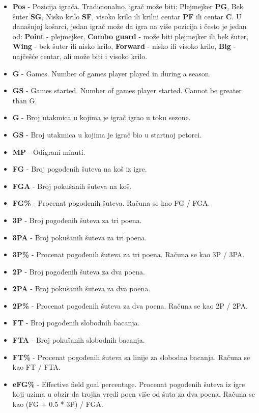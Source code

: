 \documentclass[a4paper]{article}
\begin{document}
\begin{itemize}
	\item \textbf{Pos} - Pozicija igrača. Tradicionalno, igrač može biti: Plejmejker \textbf{PG}, Bek šuter \textbf{SG}, Nisko krilo \textbf{SF}, visoko krilo ili krilni centar \textbf{PF} ili centar \textbf{C}. U današnjoj košarci, jedan igrač može da igra na više pozicija i često je jedan od: \textbf{Point} - plejmejker, \textbf{Combo guard} - može biti plejmejker ili bek šuter, \textbf{Wing} - bek šuter ili nisko krilo, \textbf{Forward} - nisko ili visoko krilo, \textbf{Big} - najčešće centar, ali može biti i visoko krilo.
	\item \textbf{G} - Games. Number of games player played in during a season.
	\item \textbf{GS} - Games started. Number of games player started. Cannot be greater than G.
    \item \textbf{G} - Broj utakmica u kojima je igrač igrao u toku sezone.
    \item \textbf{GS} - Broj utakmica u kojima je igrač bio u startnoj petorci.
    \item \textbf{MP} - Odigrani minuti.
    \item \textbf{FG} - Broj pogođenih šuteva na koš iz igre.
    \item \textbf{FGA} - Broj pokušanih šuteva na koš.
    \item \textbf{FG\%} - Procenat pogođenih šuteva. Računa se kao FG / FGA.
    \item \textbf{3P} - Broj pogođenih šuteva za tri poena.
    \item \textbf{3PA} - Broj pokušanih šuteva za tri poena.
    \item \textbf{3P\%} - Procenat pogođenih šuteva za tri poena. Računa se kao 3P / 3PA.
    \item \textbf{2P} - Broj pogođenih šuteva za dva poena.
    \item \textbf{2PA} - Broj pokušanih šuteva za dva poena.
    \item \textbf{2P\%} - Procenat pogođenih šuteva za dva poena. Računa se kao 2P / 2PA.
    \item \textbf{FT} - Broj pogođenih slobodnih bacanja.
    \item \textbf{FTA} - Broj pokušanih slobodnih bacanja.
    \item \textbf{FT\%} - Procenat pogođenih šuteva sa linije za slobodna bacanja. Računa se kao FT / FTA.
    \item \textbf{eFG\%} - Effective field goal percentage. Procenat pogođenih šuteva iz igre koji uzima u obzir da trojka vredi poen više od šuta za dva poena. Računa se kao (FG + 0.5 * 3P) / FGA.

\end{itemize}
\end{document}
